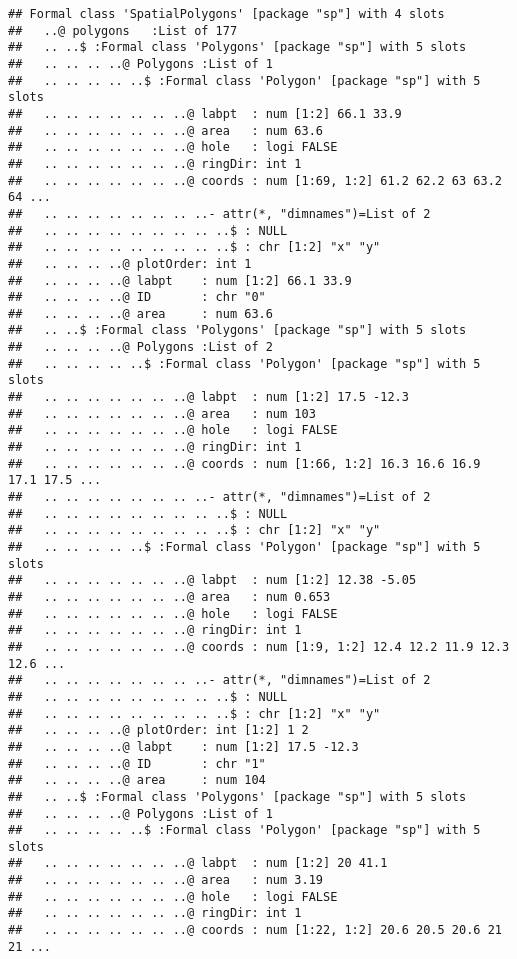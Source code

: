 \documentclass[]{article}
\begin{document}
\begin{verbatim}
## Formal class 'SpatialPolygons' [package "sp"] with 4 slots
##   ..@ polygons   :List of 177
##   .. ..$ :Formal class 'Polygons' [package "sp"] with 5 slots
##   .. .. .. ..@ Polygons :List of 1
##   .. .. .. .. ..$ :Formal class 'Polygon' [package "sp"] with 5 slots
##   .. .. .. .. .. .. ..@ labpt  : num [1:2] 66.1 33.9
##   .. .. .. .. .. .. ..@ area   : num 63.6
##   .. .. .. .. .. .. ..@ hole   : logi FALSE
##   .. .. .. .. .. .. ..@ ringDir: int 1
##   .. .. .. .. .. .. ..@ coords : num [1:69, 1:2] 61.2 62.2 63 63.2 64 ...
##   .. .. .. .. .. .. .. ..- attr(*, "dimnames")=List of 2
##   .. .. .. .. .. .. .. .. ..$ : NULL
##   .. .. .. .. .. .. .. .. ..$ : chr [1:2] "x" "y"
##   .. .. .. ..@ plotOrder: int 1
##   .. .. .. ..@ labpt    : num [1:2] 66.1 33.9
##   .. .. .. ..@ ID       : chr "0"
##   .. .. .. ..@ area     : num 63.6
##   .. ..$ :Formal class 'Polygons' [package "sp"] with 5 slots
##   .. .. .. ..@ Polygons :List of 2
##   .. .. .. .. ..$ :Formal class 'Polygon' [package "sp"] with 5 slots
##   .. .. .. .. .. .. ..@ labpt  : num [1:2] 17.5 -12.3
##   .. .. .. .. .. .. ..@ area   : num 103
##   .. .. .. .. .. .. ..@ hole   : logi FALSE
##   .. .. .. .. .. .. ..@ ringDir: int 1
##   .. .. .. .. .. .. ..@ coords : num [1:66, 1:2] 16.3 16.6 16.9 17.1 17.5 ...
##   .. .. .. .. .. .. .. ..- attr(*, "dimnames")=List of 2
##   .. .. .. .. .. .. .. .. ..$ : NULL
##   .. .. .. .. .. .. .. .. ..$ : chr [1:2] "x" "y"
##   .. .. .. .. ..$ :Formal class 'Polygon' [package "sp"] with 5 slots
##   .. .. .. .. .. .. ..@ labpt  : num [1:2] 12.38 -5.05
##   .. .. .. .. .. .. ..@ area   : num 0.653
##   .. .. .. .. .. .. ..@ hole   : logi FALSE
##   .. .. .. .. .. .. ..@ ringDir: int 1
##   .. .. .. .. .. .. ..@ coords : num [1:9, 1:2] 12.4 12.2 11.9 12.3 12.6 ...
##   .. .. .. .. .. .. .. ..- attr(*, "dimnames")=List of 2
##   .. .. .. .. .. .. .. .. ..$ : NULL
##   .. .. .. .. .. .. .. .. ..$ : chr [1:2] "x" "y"
##   .. .. .. ..@ plotOrder: int [1:2] 1 2
##   .. .. .. ..@ labpt    : num [1:2] 17.5 -12.3
##   .. .. .. ..@ ID       : chr "1"
##   .. .. .. ..@ area     : num 104
##   .. ..$ :Formal class 'Polygons' [package "sp"] with 5 slots
##   .. .. .. ..@ Polygons :List of 1
##   .. .. .. .. ..$ :Formal class 'Polygon' [package "sp"] with 5 slots
##   .. .. .. .. .. .. ..@ labpt  : num [1:2] 20 41.1
##   .. .. .. .. .. .. ..@ area   : num 3.19
##   .. .. .. .. .. .. ..@ hole   : logi FALSE
##   .. .. .. .. .. .. ..@ ringDir: int 1
##   .. .. .. .. .. .. ..@ coords : num [1:22, 1:2] 20.6 20.5 20.6 21 21 ...

\end{verbatim}
\end{document}
